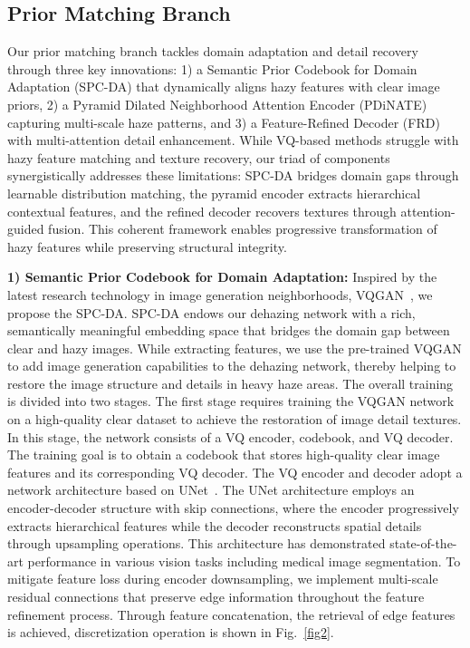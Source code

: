 \documentclass[journal]{IEEEtran}
\begin{document}
\subsection{Prior Matching Branch}
Our prior matching branch tackles domain adaptation and detail recovery through three key innovations: 1) a Semantic Prior Codebook for Domain Adaptation (SPC-DA) that dynamically aligns hazy features with clear image priors, 2) a Pyramid Dilated Neighborhood Attention Encoder (PDiNATE) capturing multi-scale haze patterns, and 3) a Feature-Refined Decoder (FRD) with multi-attention detail enhancement. While VQ-based methods struggle with hazy feature matching and texture recovery, our triad of components synergistically addresses these limitations: SPC-DA bridges domain gaps through learnable distribution matching, the pyramid encoder extracts hierarchical contextual features, and the refined decoder recovers textures through attention-guided fusion. This coherent framework enables progressive transformation of hazy features while preserving structural integrity.

	{\bf{1) Semantic Prior Codebook for Domain Adaptation:}} Inspired by the latest research technology in image generation neighborhoods, VQGAN~\cite{esser2021taming}, we propose the SPC-DA. SPC-DA endows our dehazing network with a rich, semantically meaningful embedding space that bridges the domain gap between clear and hazy images. While extracting features, we use the pre-trained VQGAN to add image generation capabilities to the dehazing network, thereby helping to restore the image structure and details in heavy haze areas. The overall training is divided into two stages. The first stage requires training the VQGAN network on a high-quality clear dataset to achieve the restoration of image detail textures. In this stage, the network consists of a VQ encoder, codebook, and VQ decoder. The training goal is to obtain a codebook that stores high-quality clear image features and its corresponding VQ decoder. The VQ encoder and decoder adopt a network architecture based on UNet~\cite{ronneberger2015u}. The UNet architecture employs an encoder-decoder structure with skip connections, where the encoder progressively extracts hierarchical features while the decoder reconstructs spatial details through upsampling operations. This architecture has demonstrated state-of-the-art performance in various vision tasks including medical image segmentation. To mitigate feature loss during encoder downsampling, we implement multi-scale residual connections that preserve edge information throughout the feature refinement process. Through feature concatenation, the retrieval of edge features is achieved, discretization operation is shown in Fig.~\ref{fig2}.
\end{document}
